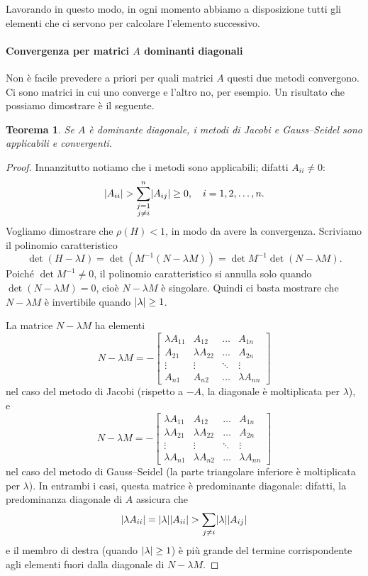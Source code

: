 \documentclass[a4paper]{report}
\DeclarePairedDelimiter{\abs}{\lvert}{\rvert}
\newtheorem{theorem}{Teorema}[chapter]
\theoremstyle{definiton}
\theoremstyle{remark}
\begin{document}
Lavorando in questo modo, in ogni momento abbiamo a disposizione tutti gli elementi che ci servono per calcolare l'elemento successivo.

\paragraph{Convergenza per matrici $A$ dominanti diagonali}

Non è facile prevedere a priori per quali matrici $A$ questi due metodi convergono. Ci sono matrici in cui uno converge e l'altro no, per esempio. Un risultato che possiamo dimostrare è il seguente.

\begin{theorem}
Se $A$ è dominante diagonale, i metodi di Jacobi e Gauss--Seidel sono applicabili e convergenti.
\end{theorem}
\begin{proof}
Innanzitutto notiamo che i metodi sono applicabili; difatti $A_{ii} \neq 0$:
\[
\abs{A_{ii}} > \sum_{\substack{j=1\\j\neq i}}^n \abs{A_{ij}} \geq 0, \quad i=1,2,\dots,n.
\]
Vogliamo dimostrare che $\rho(H)<1$, in modo da avere la convergenza. Scriviamo il polinomio caratteristico
\[
\det (H - \lambda I) = \det (M^{-1}(N-\lambda M)) = \det M^{-1} \det (N-\lambda M).
\]
Poiché $\det M^{-1} \neq 0$, il polinomio caratteristico si annulla solo quando $\det (N-\lambda M) = 0$, cioè $N-\lambda M$ è singolare. Quindi ci basta mostrare che $N-\lambda M$ è invertibile quando $\abs{\lambda} \geq 1$.

La matrice $N-\lambda M$ ha elementi
\[
N-\lambda M = -
\begin{bmatrix}
    \lambda A_{11} & A_{12} & \dots & A_{1n}\\
    A_{21} & \lambda A_{22} & \dots & A_{2n}\\
    \vdots & \vdots & \ddots & \vdots\\
    A_{n1} & A_{n2} & \dots & \lambda A_{nn}
\end{bmatrix}
\]
nel caso del metodo di Jacobi (rispetto a $-A$, la diagonale è moltiplicata per $\lambda$), e 
\[
N-\lambda M = -
\begin{bmatrix}
    \lambda A_{11} & A_{12} & \dots & A_{1n}\\
    \lambda A_{21} & \lambda A_{22} & \dots & A_{2n}\\
    \vdots & \vdots & \ddots & \vdots\\
    \lambda A_{n1} & \lambda A_{n2} & \dots & \lambda A_{nn}
\end{bmatrix}
\]
nel caso del metodo di Gauss--Seidel (la parte triangolare inferiore è moltiplicata per $\lambda$). In entrambi i casi, questa matrice è predominante diagonale: difatti, la predominanza diagonale di $A$ assicura che
\[
\abs{\lambda A_{ii}} = \abs{\lambda}\abs{ A_{ii}} > \sum_{j\neq i} \abs{\lambda} \abs{A_{ij}}
\]
e il membro di destra (quando $\abs{\lambda} \geq 1$) è più grande del termine corrispondente agli elementi fuori dalla diagonale di $N-\lambda M$.
\end{proof}
\end{document}
